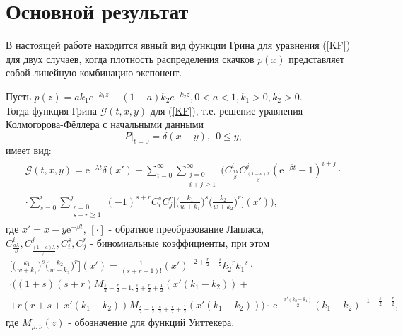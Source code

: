 \section{Основной результат}
В настоящей работе находится явный вид функции Грина для уравнения (\ref{KF}) для двух случаев, когда плотность распределения скачков $p(x)$ представляет собой линейную комбинацию экспонент. 
\begin{theorem}
Пусть $p(z)=a k_1 e^{-k_1 z} +(1-a) k_2 e^{-k_2 z}, 0<a<1, k_1>0, k_2>0$.\\
Тогда функция Грина $\mathcal{G}(t,x,y)$ для (\ref{KF}), т.е. решение уравнения Колмогорова-Фёллера с начальными данными 
\begin{equation}\label{init}
    P|_{t=0}=\delta(x-y),\ \  0 \le y,
\end{equation}    
    имеет вид:
  \begin{equation}\label{green}
  \begin{gathered}
    \mathcal{G}(t,x,y)=\mathrm{e}^{-\lambda t} \delta(x')
    +\sum\limits_{i=0}^{\infty}\sum\limits_{
    \substack{j=0\\i+j\ge 1}}^{\infty}
    \bigg( C_{\frac{a \lambda}{\beta}}^i
    C_{\frac{(1-a) \lambda}{\beta}}^j
    (\mathrm{e}^{-\beta t}-1)^{i+j} \cdot\\
    \cdot \sum\limits_{s=0}^{i}
    \sum\limits_{\substack{r=0\\s+r\ge 1}}^{j}
    (-1)^{s+r}
    C_i^s C_j^r
    \Big[\Big(\frac{k_1}{w+k_1}\Big)^s   \Big(\frac{k_2}{w+k_2}\Big)^r \Big](x') \bigg),
  \end{gathered}
\end{equation}
где $x'=x - y\mathrm{e}^{-\beta t}$, $[\cdot]$ - обратное преобразование Лапласа,\\
$C_{\frac{a \lambda}{\beta}}^i,
C_{\frac{(1-a) \lambda}{\beta}}^j,
C_i^s, C_j^r$ - биномиальные коэффициенты,
при этом 
\begin{equation}
\begin{gathered}
    \Big[\Big(\frac{k_1}{w+k_1}\Big)^s   \Big(\frac{k_2}{w+k_2}\Big)^r \Big](x')=\frac{1}{(s+r+1)!}
    (x')^{-2+\frac{r}{2}+\frac{s}{2}} {k_2}^{r} {k_1}^{s} \cdot \\
    \cdot
    \Big(\left(1+s \right) \left(s +r \right) M_{\frac{s}{2}-\frac{r}{2}+1,\frac{s}{2}+\frac{r}{2}+\frac{1}{2}}\! \left(x' \left({k_1} -{k_2} \right)\right) + \\ 
    + r \left(r +s +x' \left({k_1} -{k_2} \right)\right)M_{\frac{s}{2}-\frac{r}{2},\frac{s}{2}+\frac{r}{2}+\frac{1}{2}}\! \left(x' \left({k_1} -{k_2} \right)\right)\bigg) \cdot \ {\mathrm e}^{-\frac{x' \left({k_2} +{k_1} \right)}{2}} \left({k_1} -{k_2} \right)^{-1-\frac{s}{2}-\frac{r}{2}},
\end{gathered}
\end{equation}     
     где
     $M_{\mu,\nu}(z)$ - обозначение для функций Уиттекера.
\end{theorem}

